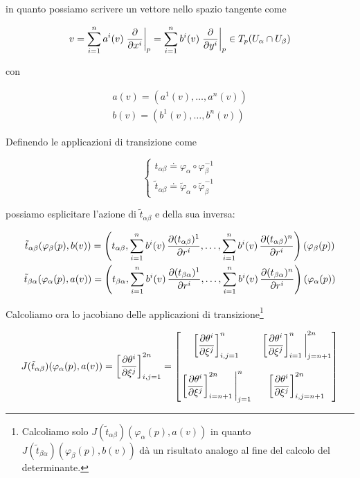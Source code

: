 {in quanto possiamo scrivere un vettore nello spazio tangente come

\begin{equation}
	v = \sum_{i=1}^{n} a^{i}(v) \eval{ \pdv{x^{i}} }_{p} %
	= \sum_{i=1}^{n} b^{i}(v) \eval{ \pdv{y^{i}} }_{p} %
	\in T_{p}(U_{\alpha} \cap U_{\beta})
\end{equation}

con

\begin{gather}
	a(v) = (a^{1}(v),\dots,a^{n}(v)) \\
	b(v) = (b^{1}(v),\dots,b^{n}(v))
\end{gather}

Definendo le applicazioni di transizione come

\begin{equation}
	\begin{cases}
		t_{\alpha \beta} \doteq \varphi_{\alpha} \circ \varphi_{\beta}^{-1} \\
		\tilde{t}_{\alpha \beta} \doteq \tilde{\varphi}_{\alpha} \circ \tilde{\varphi}_{\beta}^{-1} 
	\end{cases}
\end{equation}

possiamo esplicitare l'azione di $ \tilde{t}_{\alpha \beta} $ e della sua inversa:

\begin{gather}
	\tilde{t}_{\alpha \beta} (\varphi_{\beta}(p),b(v)) = %
	\left( t_{\alpha \beta}, \sum_{i=1}^{n} b^{i}(v) \, \pdv{(t_{\alpha \beta})^{1}}{r^{i}}, \dots, \sum_{i=1}^{n} b^{i}(v) \, \pdv{(t_{\alpha \beta})^{n}}{r^{i}} \right) (\varphi_{\beta}(p)) \\
	\tilde{t}_{\beta \alpha} (\varphi_{\alpha}(p),a(v)) = %
	\left( t_{\beta \alpha}, \sum_{i=1}^{n} b^{i}(v) \, \pdv{(t_{\beta \alpha})^{1}}{r^{i}}, \dots, \sum_{i=1}^{n} b^{i}(v) \, \pdv{(t_{\beta \alpha})^{n}}{r^{i}} \right) (\varphi_{\alpha}(p))
\end{gather}

Calcoliamo ora lo jacobiano delle applicazioni di transizione\footnote{%
	Calcoliamo solo $ J(\tilde{t}_{\alpha \beta})(\varphi_{\alpha}(p),a(v)) $ in quanto $ J(\tilde{t}_{\beta \alpha})(\varphi_{\beta}(p),b(v)) $ dà un risultato analogo al fine del calcolo del determinante.%
}

\begin{equation}
	J(\tilde{t}_{\alpha \beta})(\varphi_{\alpha}(p),a(v)) = \left[ \pdv{\theta^{i}}{\xi^{j}} \right]_{i,j=1}^{2n} %
	= \bmqty{ %
				\left[ \dpdv{\theta^{i}}{\xi^{j}} \right]_{i,j=1}^{n} & \eval{ \left[ \dpdv{\theta^{i}}{\xi^{j}} \right]_{i=1}^{n} }_{j=n+1}^{2n} \\ \\
				\eval{ \left[ \dpdv{\theta^{i}}{\xi^{j}} \right]_{i=n+1}^{2n} }_{j=1}^{n} & \left[ \dpdv{\theta^{i}}{\xi^{j}} \right]_{i,j=n+1}^{2n} %
			}
\end{equation}

}
